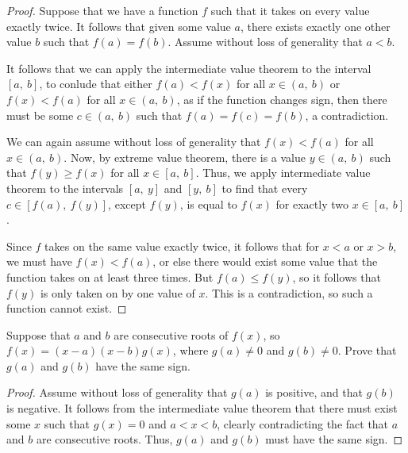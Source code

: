 \documentclass[10pt, oneside]{amsart}
\newenvironment{problem}[2][Problem]{\begin{trivlist}
\item[\hskip \labelsep {\bfseries #1}\hskip \labelsep {\bfseries #2.}]}{\end{trivlist}}
\begin{document}
    \begin{proof}
      Suppose that we have a function $f$ such that it takes on every value exactly twice. It follows that given some value $a$, there
      exists exactly one other value $b$ such that $f(a) = f(b)$. Assume without loss of generality that $a < b$.
      \newline

      It follows that we
      can apply the intermediate value theorem to the interval $[a, \ b]$, to conlude that either $f(a) < f(x)$ for all $x \in (a, \ b)$ or $f(x) < f(a)$
      for all $x \in (a, \ b)$, as if the function changes sign, then there must be some $c \in (a, \ b)$ such that $f(a) = f(c) = f(b)$, a contradiction.
      \newline

      We can again assume without loss of generality that $f(x) < f(a)$ for all $x \in (a, \ b)$. Now, by extreme value theorem, there is a value $y \in (a, \ b)$ such that
      $f(y) \geq f(x)$ for all $x \in [a, \ b]$. Thus, we apply intermediate value theorem to the intervals $[a, \ y]$ and $[y, \ b]$ to find that every $c \in [f(a), \ f(y)]$, except $f(y)$,
      is equal to $f(x)$ for exactly two $x \in [a, \ b]$.
      \newline

      Since $f$ takes on the same value exactly twice, it follows that for $x < a$ or $x > b$, we must have $f(x) < f(a)$, or else there would exist some value that the function takes on at least
      three times. But $f(a) \leq f(y)$, so it follows that $f(y)$ is only taken on by one value of $x$. This is a contradiction, so such a function cannot exist.
    \end{proof}

    \begin{problem}{10.25a}
      Suppose that $a$ and $b$ are consecutive roots of $f(x)$, so $f(x) = (x - a) (x - b) g(x)$, where $g(a) \neq 0$ and $g(b) \neq 0$.
      Prove that $g(a)$ and $g(b)$ have the same sign.
    \end{problem}

    \begin{proof}
      Assume without loss of generality that $g(a)$ is positive, and that $g(b)$ is negative. It follows from the intermediate value theorem that there must exist some $x$ such that
      $g(x) = 0$ and $a < x < b$, clearly contradicting the fact that $a$ and $b$ are consecutive roots. Thus, $g(a)$ and $g(b)$ must have the same sign.
    \end{proof}
\end{document}
